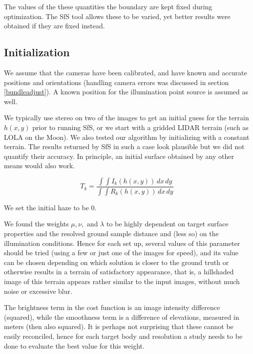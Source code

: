 \documentclass[draft,linenumbers]{agujournal}
\begin{document}
The values of the these quantities the boundary are kept fixed during optimization. The SfS tool allows these to be varied, yet better results were obtained if they are fixed instead.

\subsection{Initialization}

We assume that the cameras have been calibrated, and have known and accurate 
positions and orientations (handling camera errors was discussed in section \ref{bundleadjust}). 
A known position for the illumination point source is assumed as
well.

We typically use stereo on two of the images to get an initial guess
for the terrain $h(x, y)$ prior to running SfS, or we start with a
gridded LIDAR terrain (such as LOLA on the Moon). We also tested
our algorithm by initializing with a constant terrain. The results
returned by SfS in such a case look plausible but we did not quantify
their accuracy. In principle, an initial surface obtained by any
other means would also work.


\begin{equation}
T_k = \frac{ \int\!\! \int \! I_k(h(x, y)) \,dx\,dy }{ \int\!\! \int \! R_k(h(x, y)) \,dx\,dy}
\end{equation}

We set the initial haze to be 0. 

We found the weights $\mu, \nu,$ and $\lambda$ to be highly dependent 
on target surface properties and the resolved ground sample 
distance and (less so) on the illumination
conditions. Hence for each set up, several values of this parameter
should be tried (using a few or just one of the images for speed),
and its value can be chosen depending on which solution is closer
to the ground truth or otherwise results in a terrain of satisfactory
appearance, that is, a hillshaded image of this terrain appears
rather similar to the input images, without much noise or excessive
blur. 

The brightness term in the cost function is an image
intensity difference (squared), while the smoothness term is a
difference of elevations, measured in meters (then also squared).
It is perhaps not surprising that these cannot be easily reconciled,
hence for each target body and resolution a study needs to be done to evaluate the best value for this weight.
\end{document}
